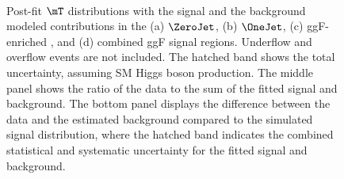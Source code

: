 \begin{figure}[htb]
  \centering
   \\
  \caption{
    Post-fit $\mT$ distributions with the signal and the background modeled contributions
    in the (a) $\ZeroJet$, (b) $\OneJet$, (c) ggF-enriched \TwoJet, and (d) combined ggF signal regions. Underflow and overflow events are not included.
    The hatched band shows the total uncertainty, assuming SM Higgs boson production.
    The middle panel shows the ratio of the data to the sum of the fitted signal and background.
    The bottom panel displays the difference between the data and the estimated background compared to the simulated signal distribution, where the hatched band indicates the combined statistical and systematic uncertainty for the fitted signal and background.
    \label{fig:ggF_MT}
  }
\end{figure}

